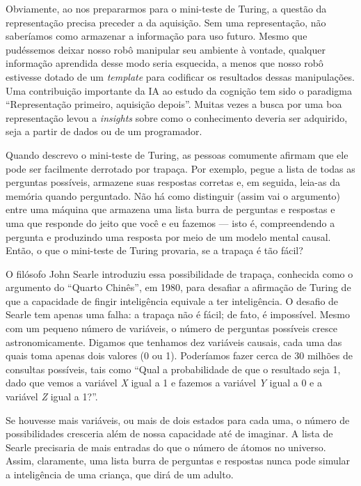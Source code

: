 \documentclass[11pt,a5paper,twoside]{book}
\begin{document}
Obviamente, ao nos prepararmos para o mini-teste de Turing, a questão da representação precisa preceder a da aquisição. Sem uma representação, não saberíamos como armazenar a informação para uso futuro. Mesmo que pudéssemos deixar nosso robô manipular seu ambiente à vontade, qualquer informação aprendida desse modo seria esquecida, a menos que nosso robô estivesse dotado de um \textit{template} para codificar os resultados dessas manipulações. Uma contribuição importante da IA ao estudo da cognição tem sido o paradigma “Representação primeiro, aquisição depois”. Muitas vezes a busca por uma boa representação levou a \textit{insights} sobre como o conhecimento deveria ser adquirido, seja a partir de dados ou de um programador.

Quando descrevo o mini-teste de Turing, as pessoas comumente afirmam que ele pode ser facilmente derrotado por trapaça. Por exemplo, pegue a lista de todas as perguntas possíveis, armazene suas respostas corretas e, em seguida, leia-as da memória quando perguntado. Não há como distinguir (assim vai o argumento) entre uma máquina que armazena uma lista burra de perguntas e respostas e uma que responde do jeito que você e eu fazemos — isto é, compreendendo a pergunta e produzindo uma resposta por meio de um modelo mental causal. Então, o que o mini-teste de Turing provaria, se a trapaça é tão fácil?

O filósofo John Searle introduziu essa possibilidade de trapaça, conhecida como o argumento do “Quarto Chinês”, em 1980, para desafiar a afirmação de Turing de que a capacidade de fingir inteligência equivale a ter inteligência. O desafio de Searle tem apenas uma falha: a trapaça não é fácil; de fato, é impossível. Mesmo com um pequeno número de variáveis, o número de perguntas possíveis cresce astronomicamente. Digamos que tenhamos dez variáveis causais, cada uma das quais toma apenas dois valores (0 ou 1). Poderíamos fazer cerca de 30 milhões de consultas possíveis, tais como “Qual a probabilidade de que o resultado seja 1, dado que vemos a variável \textit{X} igual a 1 e fazemos a variável \textit{Y} igual a 0 e a variável \textit{Z} igual a 1?”.

Se houvesse mais variáveis, ou mais de dois estados para cada uma, o número de possibilidades cresceria além de nossa capacidade até de imaginar. A lista de Searle precisaria de mais entradas do que o número de átomos no universo. Assim, claramente, uma lista burra de perguntas e respostas nunca pode simular a inteligência de uma criança, que dirá de um adulto.
\end{document}
